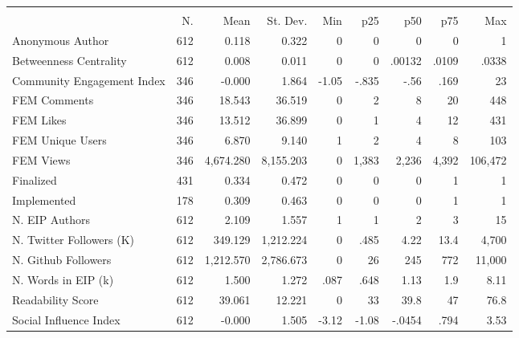 {
\def\sym#1{\ifmmode^{#1}\else\(^{#1}\)\fi}
\begin{tabular}{l*{1}{rrrrrrrr}}
\hline\hline
                    &\multicolumn{8}{c}{}                                                                                   \\
                    &          N.&        Mean&    St. Dev.&         Min&         p25&         p50&         p75&         Max\\
\hline
Anonymous Author    &         612&       0.118&       0.322&           0&           0&           0&           0&           1\\
Betweenness Centrality&         612&       0.008&       0.011&           0&           0&      .00132&       .0109&       .0338\\
Community Engagement Index&         346&      -0.000&       1.864&       -1.05&       -.835&        -.56&        .169&          23\\
FEM Comments        &         346&      18.543&      36.519&           0&           2&           8&          20&         448\\
FEM Likes           &         346&      13.512&      36.899&           0&           1&           4&          12&         431\\
FEM Unique Users    &         346&       6.870&       9.140&           1&           2&           4&           8&         103\\
FEM Views           &         346&   4,674.280&   8,155.203&           0&       1,383&       2,236&       4,392&     106,472\\
Finalized           &         431&       0.334&       0.472&           0&           0&           0&           1&           1\\
Implemented         &         178&       0.309&       0.463&           0&           0&           0&           1&           1\\
N. EIP Authors      &         612&       2.109&       1.557&           1&           1&           2&           3&          15\\
N. Twitter Followers (K)&         612&     349.129&   1,212.224&           0&        .485&        4.22&        13.4&       4,700\\
N. Github Followers &         612&   1,212.570&   2,786.673&           0&          26&         245&         772&      11,000\\
N. Words in EIP (k) &         612&       1.500&       1.272&        .087&        .648&        1.13&         1.9&        8.11\\
Readability Score   &         612&      39.061&      12.221&           0&          33&        39.8&          47&        76.8\\
Social Influence Index&         612&      -0.000&       1.505&       -3.12&       -1.08&      -.0454&        .794&        3.53\\
\hline\hline
\end{tabular}
}

